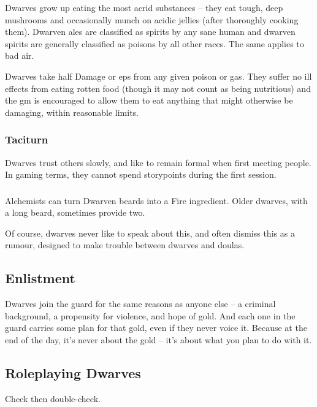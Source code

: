 \begin{multicols}{2}
Dwarves grow up eating the most acrid substances -- they eat tough, deep mushrooms and occasionally munch on acidic jellies (after thoroughly cooking them).
Dwarven ales are classified as spirits by any sane human and dwarven spirits are generally classified as poisons by all other races.
The same applies to bad air.

Dwarves take half Damage or \glspl{ep} from any given poison or gas.
They suffer no ill effects from eating rotten food (though it may not count as being nutritious) and the \gls{gm} is encouraged to allow them to eat anything that might otherwise be damaging, within reasonable limits.

\subsubsection{Taciturn}

Dwarves trust others slowly, and like to remain formal when first meeting people.
In gaming terms, they cannot spend \glspl{storypoint} during the first session.

\subsubsection{}

Alchemists can turn Dwarven beards into a Fire \gls{ingredient}.
Older dwarves, with a long beard, sometimes provide two.

Of course, dwarves never like to speak about this, and often dismiss this as a rumour, designed to make trouble between dwarves and \glspl{doula}.

\subsection{Enlistment}

Dwarves join the \gls{guard} for the same reasons as anyone else -- a criminal background, a propensity for violence, and hope of gold.
And each one in the \gls{guard} carries some plan for that gold, even if they never voice it.
Because at the end of the day, it's never about the gold -- it's about what you plan to do with it.

\subsection{Roleplaying Dwarves}

Check then double-check.


\end{multicols}
